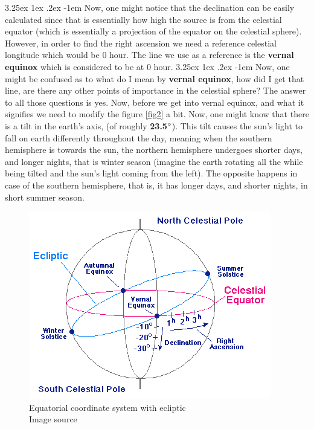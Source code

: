\documentclass[a4paper,twoside,11pt]{article}
\makeatletter
\numberwithin{equation}{section}
\renewcommand\paragraph{\@startsection{paragraph}{5}{\z@}%
  {3.25ex \@plus1ex \@minus.2ex}%
  {-1em}%
  {\normalfont\normalsize\bfseries}}
\makeatother
\begin{document}
\paragraph{}
Now, one might notice that the declination can be easily calculated since that is essentially how high the source is from the celestial equator (which is essentially a projection of the equator on the celestial sphere). However, in order to find the right ascension we need a reference celestial longitude which would be 0 hour. The line we use as a reference is the \textbf{vernal equinox} which is considered to be at 0 hour. 
\paragraph{}
Now, one might be confused as to what do I mean by \textbf{vernal equinox}, how did I get that line, are there any other points of importance in the celestial sphere? The answer to all those questions is yes. Now, before we get into vernal equinox, and what it signifies we need to modify the figure \ref{fig2} a bit. Now, one might know that there is a tilt in the earth's axis, (of roughly \textbf{23.5$\degree$}). This tilt causes the sun's light to fall on earth differently throughout the day, meaning when the southern hemisphere is towards the sun, the northern hemisphere undergoes shorter days, and longer nights, that is winter season (imagine the earth rotating all the while being tilted and the sun's light coming from the left). The opposite happens in case of the southern hemisphere, that is, it has longer days, and shorter nights, in short summer season.
\begin{figure}
\begin{center}
\includegraphics[width=0.8\linewidth]{fig3.png} 
\caption{Equatorial coordinate system with ecliptic \\ Image source \cite{equi_coord2}}
\label{fig3}
\end{center}
\end{figure}
\newpage
\end{document}
